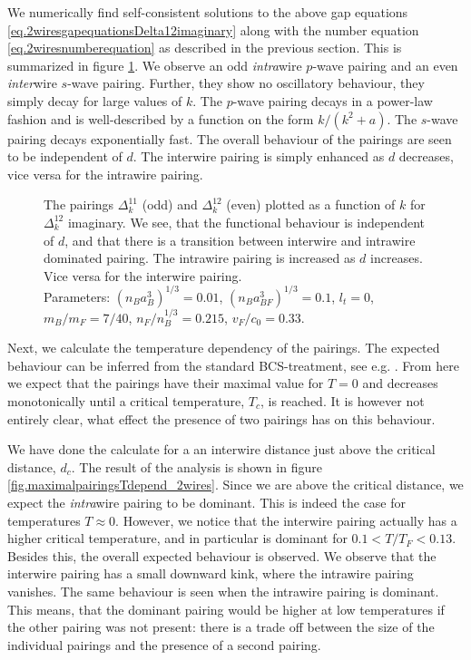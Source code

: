 We numerically find self-consistent solutions to the above gap equations \eqref{eq.2wiresgapequationsDelta12imaginary} along with the number equation \eqref{eq.2wiresnumberequation} as described in the previous section. This is summarized in figure \ref{fig.pairingkdependT0dvaried}. We observe an odd \textit{intra}wire $p$-wave pairing and an even \textit{inter}wire $s$-wave pairing. Further, they show no oscillatory behaviour, they simply decay for large values of $k$. The $p$-wave pairing decays in  a power-law fashion and is well-described by a function on the form $k / (k^2 + a)$. The $s$-wave pairing decays exponentially fast. The overall behaviour of the pairings are seen to be independent of $d$. The interwire pairing is simply enhanced as $d$ decreases, vice versa for the intrawire pairing.  

\begin{figure} 
\begin{center}  
  
\caption{The pairings $\Delta^{11}_k$ (odd) and $\Delta^{12}_k$ (even) plotted as a function of $k$ for $\Delta^{12}_k$ imaginary. We see, that the functional behaviour is independent of $d$, and that there is a transition between interwire and intrawire dominated pairing. The intrawire pairing is increased as $d$ increases. Vice versa for the interwire pairing. \\
Parameters: $(n_Ba_B^3)^{1/3} = 0.01$, $(n_Ba_{BF}^3)^{1/3} = 0.1$, $l_t = 0$, $m_B / m_F = 7/40$, $n_F / n_B^{1/3} = 0.215$, $v_F / c_0 = 0.33$. }  
\label{fig.pairingkdependT0dvaried}  
\end{center}    
\end{figure}

Next, we calculate the temperature dependency of the pairings. The expected behaviour can be inferred from the standard BCS-treatment, see e.g. \cite[p. 369]{PlischkeStatPhys}. From here we expect that the pairings have their maximal value for $T = 0$ and decreases monotonically until a critical temperature, $T_c$, is reached. It is however not entirely clear, what effect the presence of two pairings has on this behaviour. 

We have done the calculate for a an interwire distance just above the critical distance, $d_c$. The result of the analysis is shown in figure \ref{fig.maximalpairingsTdepend_2wires}. Since we are above the critical distance, we expect the \textit{intra}wire pairing to be dominant. This is indeed the case for temperatures $T \approx 0$. However, we notice that the interwire pairing actually has a higher critical temperature, and in particular is dominant for $0.1 < T / T_F < 0.13$. Besides this, the overall expected behaviour is observed. We observe that the interwire pairing has a small downward kink, where the intrawire pairing vanishes. The same behaviour is seen when the intrawire pairing is dominant. This means, that the dominant pairing would be higher at low temperatures if the other pairing was not present: there is a trade off between the size of the individual pairings and the presence of a second pairing.

